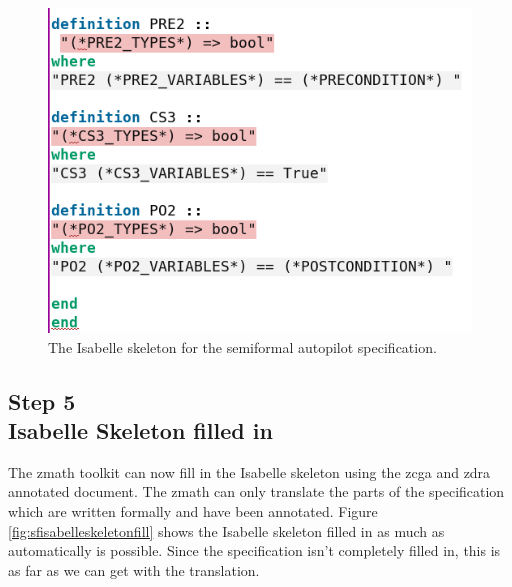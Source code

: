 \begin{figure}[H]
\begin{minipage}{0.45\textwidth}
     \includegraphics[width=\linewidth]{Figures/fullexample/sfisabelle2.png}
     \end{minipage}
     \caption{The Isabelle skeleton for the semiformal autopilot specification. \label{fig:sfisabelleskeleton}}
\end{figure}

\subsection{Step 5\\Isabelle Skeleton filled in}

The \gls{zmath} toolkit can now fill in the Isabelle skeleton using the
\gls{zcga} and \gls{zdra} annotated document. The \gls{zmath} can only translate
the parts of the specification which are written formally and have been
annotated. Figure \ref{fig:sfisabelleskeletonfill} shows the Isabelle skeleton filled in as much as
automatically is possible. Since the specification isn't completely filled in, this is as far as we can get
with the translation.

